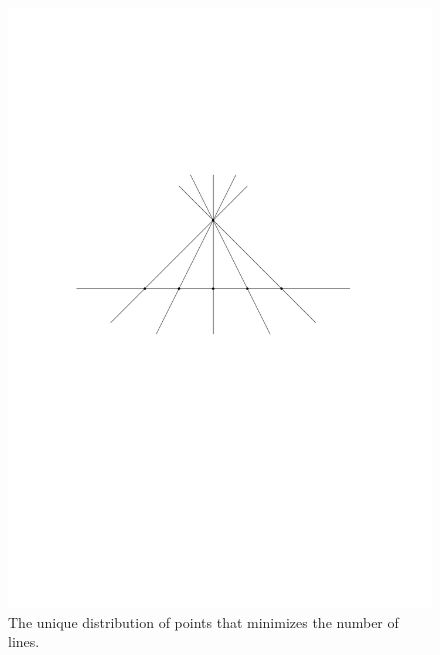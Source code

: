 \documentclass[12pt]{amsart}
\theoremstyle{definition}
\begin{document}
\begin{figure}[h]
\includegraphics[scale=.5]{../imgs/simpson_lines}%
\caption{The unique distribution of points that minimizes the number of lines.\label{fig:sylvester}}
\end{figure}
\end{document}
